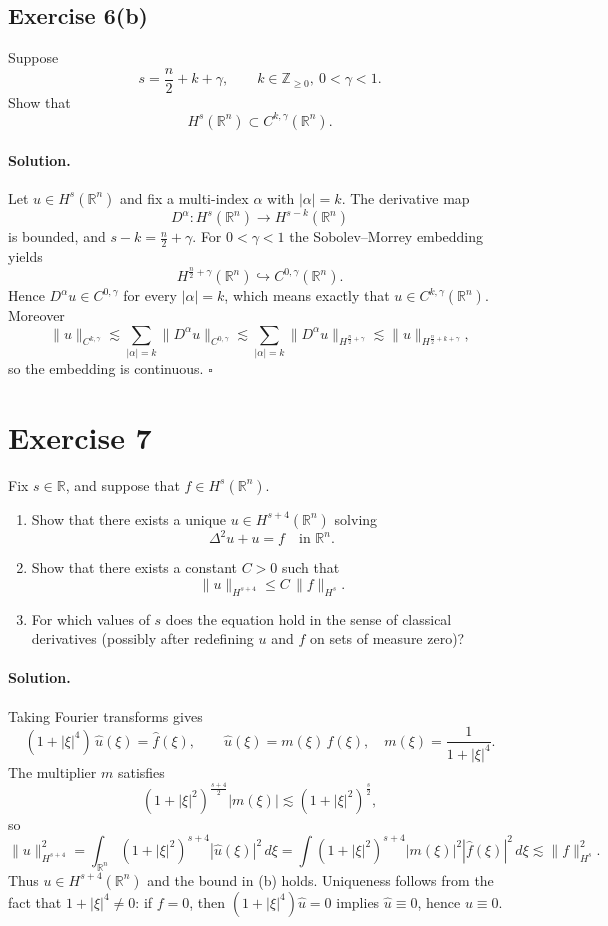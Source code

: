 \documentclass[12pt,a4paper]{article}
\newcommand{\qed}{\hfill$\square$}
\theoremstyle{plain}
\theoremstyle{definition}
\theoremstyle{remark}
\theoremstyle{remark}
\begin{document}
\subsection*{Exercise 6(b)}
Suppose
\[
s = \frac n2 + k + \gamma, \qquad k\in\mathbb Z_{\ge 0},\ 0<\gamma<1.
\]
Show that
\[
H^s(\mathbb R^n) \subset C^{k,\gamma}(\mathbb R^n).
\]

\paragraph{Solution.}
Let $u\in H^s(\mathbb R^n)$ and fix a multi-index $\alpha$ with $|\alpha|=k$.
The derivative map
\[
D^\alpha : H^s(\mathbb R^n)\longrightarrow H^{s-k}(\mathbb R^n)
\]
is bounded, and $s-k=\frac n2+\gamma$.
For $0<\gamma<1$ the Sobolev--Morrey embedding yields
\[
H^{\frac n2+\gamma}(\mathbb R^n)\hookrightarrow C^{0,\gamma}(\mathbb R^n).
\]
Hence $D^\alpha u\in C^{0,\gamma}$ for every $|\alpha|=k$, which means exactly that
$u\in C^{k,\gamma}(\mathbb R^n)$. Moreover
\[
\|u\|_{C^{k,\gamma}}
\lesssim \sum_{|\alpha|=k} \|D^\alpha u\|_{C^{0,\gamma}}
\lesssim \sum_{|\alpha|=k} \|D^\alpha u\|_{H^{\frac n2+\gamma}}
\lesssim \|u\|_{H^{\frac n2+k+\gamma}},
\]
so the embedding is continuous.
\qed

\bigskip
\bigskip

\section*{Exercise 7}
Fix $s\in\mathbb R$, and suppose that $f\in H^s(\mathbb R^n)$.
\begin{enumerate}
	\item[(a)] Show that there exists a unique $u\in H^{s+4}(\mathbb R^n)$ solving
	\[
	\Delta^2 u + u = f \quad\text{in }\mathbb R^n.
	\]
	\item[(b)] Show that there exists a constant $C>0$ such that
	\[
	\|u\|_{H^{s+4}} \le C\,\|f\|_{H^s}.
	\]
	\item[(c)] For which values of $s$ does the equation hold in the sense of classical derivatives
	(possibly after redefining $u$ and $f$ on sets of measure zero)?
\end{enumerate}

\paragraph{Solution.}
Taking Fourier transforms gives
\[
(1+|\xi|^4)\,\widehat u(\xi) = \widehat f(\xi), \qquad
\widehat u(\xi) = m(\xi)\,\widehat f(\xi), \quad m(\xi)=\frac{1}{1+|\xi|^4}.
\]
The multiplier $m$ satisfies
\[
(1+|\xi|^2)^{\frac{s+4}{2}} |m(\xi)|
\lesssim (1+|\xi|^2)^{\frac{s}{2}},
\]
so
\[
\|u\|_{H^{s+4}}^2
= \int_{\mathbb R^n} (1+|\xi|^2)^{s+4} |\widehat u(\xi)|^2 \,d\xi
= \int (1+|\xi|^2)^{s+4} |m(\xi)|^2 |\widehat f(\xi)|^2\,d\xi
\lesssim \|f\|_{H^s}^2.
\]
Thus $u\in H^{s+4}(\mathbb R^n)$ and the bound in (b) holds.
Uniqueness follows from the fact that $1+|\xi|^4\neq 0$:
if $f=0$, then $(1+|\xi|^4)\widehat u=0$ implies $\widehat u\equiv 0$, hence $u\equiv 0$.
\end{document}
